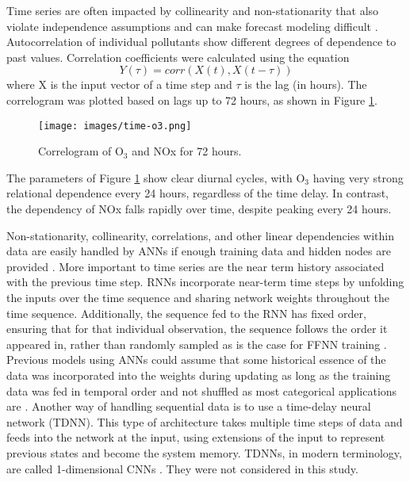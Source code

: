 Time series are often impacted by collinearity and non-stationarity that also violate independence assumptions and can make forecast modeling difficult \citep{Gheyas2011}. Autocorrelation of individual pollutants show different degrees of dependence to past values.  Correlation coefficients were calculated using the equation
%
\begin{equation}
\label{eq:corr}
Y(\tau)= corr(X(t),X(t - \tau))
\end{equation}
%
\noindent
where X is the input vector of a time step and $\tau$ is the lag (in hours). The correlogram was plotted based on lags up to 72 hours, as shown in Figure \ref{fig:serialcorr}.
%
\begin{figure}[H]
\centering
\texttt{[image: images/time-o3.png]}  %
\caption{Correlogram of O$_{3}$ and NOx for 72 hours.}
\label{fig:serialcorr}
\end{figure}
%
The parameters of Figure \ref{fig:serialcorr} show clear diurnal cycles, with O$_{3}$ having very strong relational dependence every 24 hours, regardless of the time delay. In contrast, the dependency of NOx falls rapidly over time, despite peaking every 24 hours. 

Non-stationarity, collinearity, correlations, and other linear dependencies within data are easily handled by ANNs if enough training data and hidden nodes are provided \citep{Goodfellow2016}. More important to time series are the near term history associated with the previous time step. RNNs incorporate near-term time steps by unfolding the inputs over the time sequence and sharing network weights throughout the time sequence. Additionally, the sequence fed to the RNN has fixed order, ensuring that for that individual observation, the sequence follows the order it appeared in, rather than randomly sampled as is the case for FFNN training \citep{Elangasinghe2014}. Previous models using ANNs could assume that some historical essence of the data was incorporated into the weights during updating as long as the training data was fed in temporal order and not shuffled as most categorical applications are \citep{Bengio2012}. Another way of handling sequential data is to use a time-delay neural network (TDNN). This type of architecture takes multiple time steps of data and feeds into the network at the input, using extensions of the input to represent previous states and become the system memory. TDNNs, in modern terminology, are called 1-dimensional CNNs \citep{Goodfellow2016}. They were not considered in this study.

